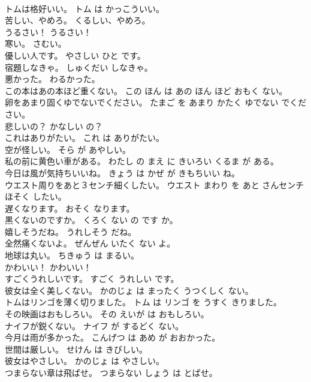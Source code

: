 \documentclass[8pt]{extreport}
\begin{document}
\begin{CJK}{UTF8}{min}
\\	トムは格好いい。	トム は かっこういい。	
\\	苦しい、やめろ。	くるしい、やめろ。	
\\	うるさい！	うるさい！	
\\	寒い。	さむい。	
\\	優しい人です。	やさしい ひと です。	
\\	宿題しなきゃ。	しゅくだい しなきゃ。	
\\	悪かった。	わるかった。	
\\	この本はあの本ほど重くない。	この ほん は あの ほん ほど おもく ない。	
\\	卵をあまり固くゆでないでください。	たまご を あまり かたく ゆでない でください。	
\\	悲しいの？	かなしい の？	
\\	これはありがたい。	これ は ありがたい。	
\\	空が怪しい。	そら が あやしい。	
\\	私の前に黄色い車がある。	わたし の まえ に きいろい くるま が ある。	
\\	今日は風が気持ちいいね。	きょう は かぜ が きもちいい ね。	
\\	ウエスト周りをあと３センチ細くしたい。	ウエスト まわり を あと さんセンチ ほそく したい。	
\\	遅くなります。	おそく なります。	
\\	黒くないのですか。	くろく ない の です か。	
\\	嬉しそうだね。	うれしそう だね。	
\\	全然痛くないよ。	ぜんぜん いたく ない よ。	
\\	地球は丸い。	ちきゅう は まるい。	
\\	かわいい！	かわいい！	
\\	すごくうれしいです。	すごく うれしい です。	
\\	彼女は全く美しくない。	かのじょ は まったく うつくしく ない。	
\\	トムはリンゴを薄く切りました。	トム は リンゴ を うすく きりました。	
\\	その映画はおもしろい。	その えいが は おもしろい。	
\\	ナイフが鋭くない。	ナイフ が するどく ない。	
\\	今月は雨が多かった。	こんげつ は あめ が おおかった。	
\\	世間は厳しい。	せけん は きびしい。	
\\	彼女はやさしい。	かのじょ は やさしい。	
\\	つまらない章は飛ばせ。	つまらない しょう は とばせ。	

\end{CJK}
\end{document}
